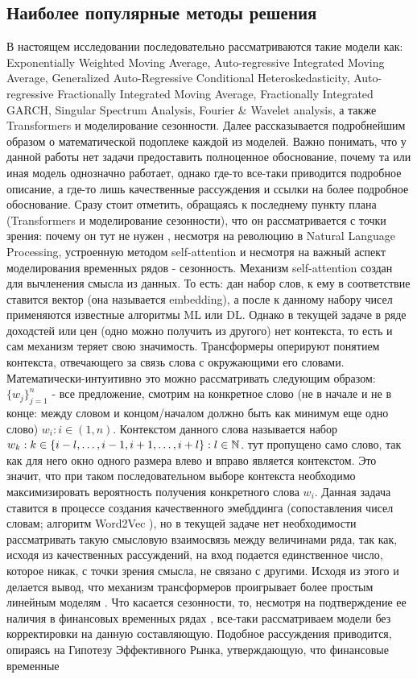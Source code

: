 	\subsection{Наиболее популярные методы решения}
		В настоящем исследовании последовательно рассматриваются такие модели как: Exponentially Weighted Moving Average, Auto-regressive Integrated Moving Average, Generalized Auto-Regressive Conditional Heteroskedasticity, Auto-regressive Fractionally Integrated Moving Average, Fractionally Integrated GARCH, Singular Spectrum Analysis, Fourier \& Wavelet analysis, а также Transformers и моделирование сезонности. Далее рассказывается подробнейшим образом о математической подоплеке каждой из моделей. Важно понимать, что у данной работы нет задачи предоставить полноценное обоснование, почему та или иная модель однозначно работает, однако где-то все-таки приводится подробное описание, а где-то лишь качественные рассуждения и ссылки на более подробное обоснование. Сразу стоит отметить, обращаясь к последнему пункту плана (Transformers и моделирование сезонности), что он рассматривается с точки зрения: почему он тут не нужен \cite{transformers_are_useless_for_TSF}, несмотря на революцию в Natural Language Processing, устроенную методом self-attention \cite{attention_transformers} и несмотря на важный аспект моделирования временных рядов - сезонность. Механизм self-attention создан для вычленения смысла из данных. То есть: дан набор слов, к ему в соответствие ставится вектор (она называется embedding), а после к данному набору чисел применяются известные алгоритмы ML или DL. Однако в текущей задаче в ряде доходстей или цен (одно можно получить из другого) нет контекста, то есть и сам механизм теряет свою значимость. Трансформеры оперируют понятием контекста, отвечающего за связь слова с окружающими его словами. Математически-интуитивно это можно рассматривать следующим образом: $\{w_j\}_{j=1}^n$ - все предложение, смотрим на конкретное слово (не в начале и не в конце: между словом и концом/началом должно быть как минимум еще одно слово) $w_i: i \in (1,n)$. Контекстом данного слова называется набор $w_k: k \in \{i - l, \ldots, i - 1, i + 1, \ldots, i + l\}: l \in \mathbb{N}$. тут пропущено само слово, так как для него окно одного размера влево и вправо является контекстом. Это значит, что при таком последовательном выборе контекста необходимо максимизировать вероятность получения конкретного слова $w_i$. Данная задача ставится в процессе создания качественного эмебддинга (сопоставления чисел словам; алгоритм Word2Vec \cite{word2vec_2013}), но в текущей задаче нет необходимости рассматривать такую смысловую взаимосвязь между величинами ряда, так как, исходя из качественных рассуждений, на вход подается единственное число, которое никак, с точки зрения смысла, не связано с другими. Исходя из этого и делается вывод, что механизм трансформеров проигрывает более простым линейным моделям \cite{transformers_are_useless_for_TSF}. Что касается сезонности, то, несмотря на подтверждение ее наличия в финансовых временных рядах \cite{seasonality_in_financial_TS_is_real}, все-таки рассматриваем модели без корректировки на данную составляющую. Подобное рассуждения приводится, опираясь на Гипотезу Эффективного Рынка, утверждающую, что финансовые временные 